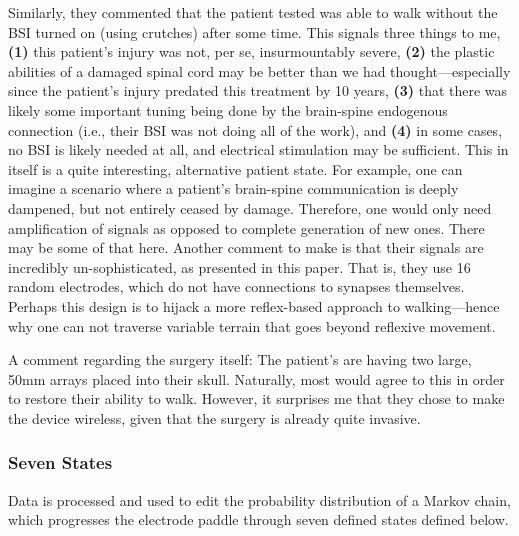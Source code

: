 \documentclass[12pt]{report}
\begin{document}
Similarly, they commented that the patient tested was able to walk without the BSI turned on (using crutches) after some time. This signals three things to me, \textbf{(1)} this patient's injury was not, per se, insurmountably severe, \textbf{(2)} the plastic abilities of a damaged spinal cord may be better than we had thought---especially since the patient's injury predated this treatment by 10 years, \textbf{(3)} that there was likely some important tuning being done by the brain-spine endogenous connection (i.e., their BSI was not doing all of the work), and \textbf{(4)} in some cases, no BSI is likely needed at all, and electrical stimulation may be sufficient. This in itself is a quite interesting, alternative patient state. For example, one can imagine a scenario where a patient's brain-spine communication is deeply dampened, but not entirely ceased by damage. Therefore, one would only need amplification of signals as opposed to complete generation of new ones. There may be some of that here. Another comment to make is that their signals are incredibly un-sophisticated, as presented in this paper. That is, they use 16 random electrodes, which do not have connections to synapses themselves. Perhaps this design is to hijack a more reflex-based approach to walking---hence why one can not traverse variable terrain that goes beyond reflexive movement.\newline

A comment regarding the surgery itself: The patient's are having two large, 50mm arrays placed into their skull. Naturally, most would agree to this in order to restore their ability to walk. However, it surprises me that they chose to make the device wireless, given that the surgery is already quite invasive. 

\subsubsection{Seven States} 

Data is processed and used to edit the probability distribution of a Markov chain, which progresses the electrode paddle through seven defined states defined below.
\end{document}
